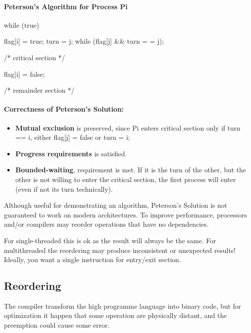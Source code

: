 \paragraph{Peterson’s Algorithm for Process Pi}


\begin{codeInC}
while (true){
    flag[i] = true;
    turn = j;
    while (flag[j] && turn = = j);
    
    /* critical section */
    
    flag[i] = false;
    
    /* remainder section */
}
\end{codeInC}

\newpage
\paragraph{Correctness of Peterson’s Solution:} 

\begin{itemize}
    \item \textbf{Mutual exclusion} is preserved, since Pi enters critical section only if turn == i, either flag[j] = false or turn = i;
    \item \textbf{Progress requirements} is satisfied.
    \item \textbf{Bounded-waiting}, requirement is met. If it is the turn of the other, but the other is not willing to enter the critical
section, the first process will enter (even if not its turn technically).
\end{itemize}

Although useful for demonstrating an algorithm, Peterson’s
Solution is not guaranteed to work on modern architectures. To improve performance, processors and/or compilers may
reorder operations that have no dependencies.

For single-threaded this is ok as the result will always be the
same. 
For multithreaded the reordering may produce inconsistent or
unexpected results! Ideally, you want a single instruction for entry/exit section.

\subsection{Reordering}

The compiler transform the high programme language into binary code, but for optimization it happen that some operation are physically distant, and the preemption could cause some error.

